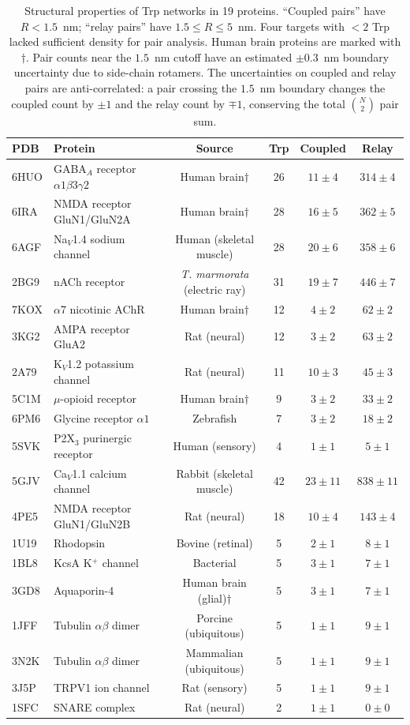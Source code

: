 \documentclass[aps,pre,twocolumn,showpacs,superscriptaddress]{revtex4-2}
\begin{document}
\begin{table}[htbp]
\caption{Structural properties of Trp networks in 19 proteins. ``Coupled pairs'' have $R < 1.5$~nm; ``relay pairs'' have $1.5 \leq R \leq 5$~nm. Four targets with $<2$ Trp lacked sufficient density for pair analysis. Human brain proteins are marked with $\dagger$. Pair counts near the $1.5$~nm cutoff have an estimated $\pm 0.3$~nm boundary uncertainty due to side-chain rotamers. The uncertainties on coupled and relay pairs are anti-correlated: a pair crossing the $1.5$~nm boundary changes the coupled count by $\pm1$ and the relay count by $\mp1$, conserving the total $\binom{N}{2}$ pair sum.}
\label{tab:structural}
\centering
\begin{tabular}{llcccc}
\toprule
PDB & Protein & Source & Trp & Coupled & Relay \\
\midrule
6HUO & GABA$_A$ receptor $\alpha1\beta3\gamma2$ & Human brain$\dagger$ & 26 & $11\pm4$ & $314\pm4$ \\
6IRA & NMDA receptor GluN1/GluN2A & Human brain$\dagger$ & 28 & $16\pm5$ & $362\pm5$ \\
6AGF & Na$_V$1.4 sodium channel & Human (skeletal muscle) & 28 & $20\pm6$ & $358\pm6$ \\
2BG9 & nACh receptor & \emph{T. marmorata} (electric ray) & 31 & $19\pm7$ & $446\pm7$ \\
7KOX & $\alpha$7 nicotinic AChR & Human brain$\dagger$ & 12 & $4\pm2$ & $62\pm2$ \\
3KG2 & AMPA receptor GluA2 & Rat (neural) & 12 & $3\pm2$ & $63\pm2$ \\
2A79 & K$_V$1.2 potassium channel & Rat (neural) & 11 & $10\pm3$ & $45\pm3$ \\
5C1M & $\mu$-opioid receptor & Human brain$\dagger$ & 9 & $3\pm2$ & $33\pm2$ \\
6PM6 & Glycine receptor $\alpha1$ & Zebrafish & 7 & $3\pm2$ & $18\pm2$ \\
5SVK & P2X$_3$ purinergic receptor & Human (sensory) & 4 & $1\pm1$ & $5\pm1$ \\
\addlinespace
5GJV & Ca$_V$1.1 calcium channel & Rabbit (skeletal muscle) & 42 & $23\pm11$ & $838\pm11$ \\
4PE5 & NMDA receptor GluN1/GluN2B & Rat (neural) & 18 & $10\pm4$ & $143\pm4$ \\
1U19 & Rhodopsin & Bovine (retinal) & 5 & $2\pm1$ & $8\pm1$ \\
1BL8 & KcsA K$^+$ channel & Bacterial & 5 & $3\pm1$ & $7\pm1$ \\
3GD8 & Aquaporin-4 & Human brain (glial)$\dagger$ & 5 & $3\pm1$ & $7\pm1$ \\
1JFF & Tubulin $\alpha\beta$ dimer & Porcine (ubiquitous) & 5 & $1\pm1$ & $9\pm1$ \\
3N2K & Tubulin $\alpha\beta$ dimer & Mammalian (ubiquitous) & 5 & $1\pm1$ & $9\pm1$ \\
3J5P & TRPV1 ion channel & Rat (sensory) & 5 & $1\pm1$ & $9\pm1$ \\
1SFC & SNARE complex & Rat (neural) & 2 & $1\pm1$ & $0\pm0$ \\
\bottomrule
\end{tabular}
\end{table}
\end{document}
